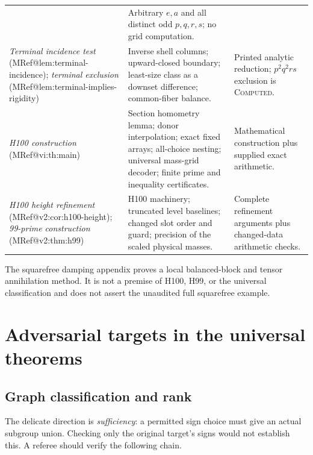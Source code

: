 \documentclass[10pt]{article}
\makeatletter
\newcommand{\mclaim}[2]{\textit{#2} (\csname MRef@#1\endcsname)}
\newcommand{\computed}{\textsc{Computed}}
\makeatother
\begin{document}
\begin{longtable}{@{}>{\raggedright\arraybackslash}p{.29\linewidth}>{\raggedright\arraybackslash}p{.34\linewidth}>{\raggedright\arraybackslash}p{.29\linewidth}@{}}
& Arbitrary $e,a$ and all distinct odd $p,q,r,s$; no grid computation.\\[.5em]
\mclaim{lem:terminal-incidence}{Terminal incidence test};
\mclaim{lem:terminal-implies-rigidity}{terminal exclusion}
& Inverse shell columns; upward-closed boundary; least-size class as a
downset difference; common-fiber balance.
& Printed analytic reduction; $p^2q^2rs$ exclusion is \computed.\\[.5em]
\mclaim{vi:th:main}{H100 construction}
& Section homometry lemma; donor interpolation; exact fixed arrays;
all-choice nesting; universal mass-grid decoder; finite prime and
inequality certificates.
& Mathematical construction plus supplied exact arithmetic.\\[.5em]
\mclaim{v2:cor:h100-height}{H100 height refinement};
\mclaim{v2:thm:h99}{99-prime construction}
& H100 machinery; truncated level baselines; changed slot order and
guard; precision of the scaled physical masses.
& Complete refinement arguments plus changed-data arithmetic checks.\\
\bottomrule
\end{longtable}
\normalsize
The squarefree damping appendix proves a local balanced-block and tensor
annihilation method. It is not a premise of H100, H99, or the universal
classification and does not assert the unaudited full squarefree example.

\newpage
\section{Adversarial targets in the universal theorems}

\subsection{Graph classification and rank}
The delicate direction is \emph{sufficiency}: a permitted sign choice must
give an actual subgroup union. Checking only the original target's signs
would not establish this. A referee should verify the following chain.
\end{document}
